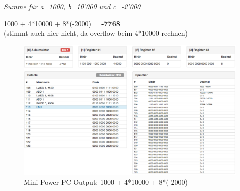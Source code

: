\documentclass[10pt]{article}
\begin{document}
\begin{enumerate}[label=\alph*)]
			
			\textit{Summe für a=1000, b=10’000 und c=-2’000}
			
			1000 + 4*10000 + 8*(-2000) = \textbf{-7768}\\
			(stimmt auch hier nicht, da overflow beim 4*10000 rechnen)
			
			\begin{figure}[H]
				\centering
				\includegraphics[width=\textwidth]{images/4c_d.png}
				\caption{Mini Power PC Output: 1000 + 4*10000 + 8*(-2000)}
				\label{fig:Bild1}
			\end{figure}
			
			
\end{enumerate}
\end{document}
